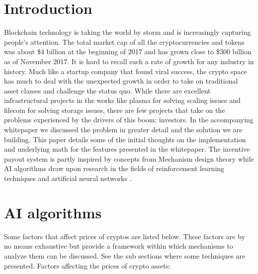 \documentclass[a4paper]{article}
\begin{document}
\section{Introduction}\label{Sect:Introduction}
Blockchain technology is taking the world by storm and is increasingly capturing people's attention. The total market cap of all the cryptocurrencies and tokens was about \$4 billion at the beginning of 2017 and has grown close to \$300 billion as of November 2017. It is hard to recall such a rate of growth for any industry in history. Much like a startup company that found viral success, the crypto space has much to deal with the unexpected growth in order to take on traditional asset classes and challenge the status quo. While there are excellent infrastructural projects in the works like plasma \cite{Plasma} for solving scaling issues and filecoin \cite{Filecoin} for solving storage issues, there are few projects that take on the problems experienced by the drivers of this boom: investors. In the accompanying whitepaper \cite{Picolo_Whitepaper} we discussed the problem in greater detail and the solution we are building. This paper details some of the initial thoughts on the implementation and underlying math for the features presented in the whitepaper. The incentive payout system is partly inspired by concepts from Mechanism design theory \cite{Mechanism_design} while AI algorithms draw upon research in the fields of reinforcement learning techniques \cite{Reinforcement_learning} and artificial neural networks \cite{Artificial_neural_network}.

\section{AI algorithms}
Some factors that affect prices of cryptos are listed below. These factors are by no means exhaustive but provide a framework within which mechanisms to analyze them can be discussed. See the sub sections where some techniques are presented.
Factors affecting the prices of crypto assets:
\end{document}
